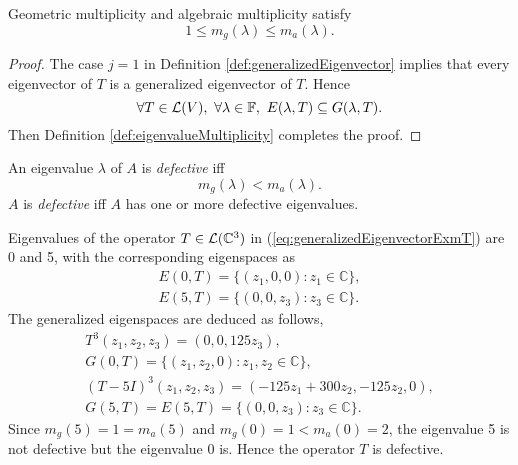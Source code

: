 \begin{coro}
  \label{coro:geoNotExceedAlg}
  Geometric multiplicity and algebraic multiplicity satisfy
  \begin{equation}
    \label{eq:geoNotExceedAlg}
    1 \le m_g(\lambda) \le m_a(\lambda).
  \end{equation}
\end{coro}
\begin{proof}
  The case $j=1$ in Definition \ref{def:generalizedEigenvector}
  implies that
  every eigenvector of $T$ is a generalized eigenvector of $T$.
  Hence 
  \begin{displaymath}
    \forall T\in{\cal L}(V),\ \forall \lambda\in \mathbb{F},\ 
    E(\lambda,T)\subseteq G(\lambda, T).
  \end{displaymath}
  Then Definition \ref{def:eigenvalueMultiplicity} completes the proof.
\end{proof}

\begin{defn}
  An eigenvalue $\lambda$ of $A$ is \emph{defective} iff
  \begin{equation}
    \label{eq:defectEigenvalue}
    m_g(\lambda) < m_a(\lambda).
  \end{equation}
  $A$ is \emph{defective}
  iff $A$ has one or more defective eigenvalues.
\end{defn}

\begin{exm}
  \label{exm:multiplicities}
  Eigenvalues of the operator $T\in {\cal L}(\mathbb{C}^3)$ in
  (\ref{eq:generalizedEigenvectorExmT}) are 0 and 5,
  with the corresponding eigenspaces as
  \begin{displaymath}
    \begin{array}{l}
      E(0,T) = \{(z_1,0,0): z_1\in \mathbb{C}\}, \\
      E(5,T) = \{(0,0,z_3): z_3\in \mathbb{C}\}.
    \end{array}
  \end{displaymath}
  The generalized eigenspaces are deduced as follows,
  \begin{displaymath}
    \begin{array}{l}
      T^3(z_1, z_2, z_3) = (0, 0, 125 z_3), 
      \\
      G(0, T) = \{(z_1, z_2, 0): z_1, z_2\in \mathbb{C}\},
      \\
      (T-5I)^3(z_1, z_2, z_3) =
      (-125 z_1+300 z_2, -125 z_2, 0),
      \\
      G(5,T) = E(5,T) = \{(0,0,z_3): z_3\in \mathbb{C}\}.
    \end{array}
  \end{displaymath}
  Since $m_g(5)=1=m_a(5)$ and $m_g(0)=1<m_a(0)=2$, 
  the eigenvalue 5 is not defective
  but the eigenvalue 0 is. 
  Hence the operator $T$ is defective.
\end{exm}

